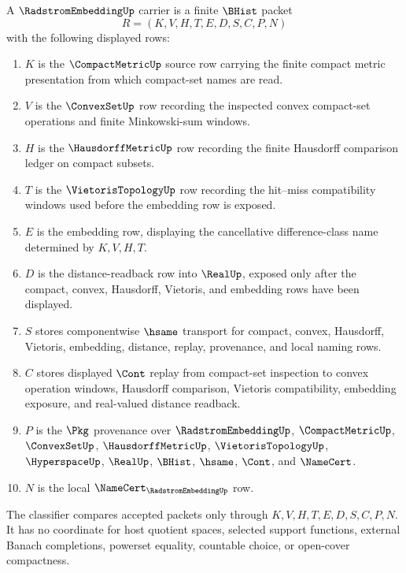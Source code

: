 \begin{definition}\label{def:radstrom-embedding-carrier}
A $\RadstromEmbeddingUp$ carrier is a finite $\BHist$ packet
$$
R=(K,V,H,T,E,D,S,C,P,N)
$$
with the following displayed rows:
\begin{enumerate}
\item $K$ is the $\CompactMetricUp$ source row carrying the finite compact metric presentation from which compact-set names are read.
\item $V$ is the $\ConvexSetUp$ row recording the inspected convex compact-set operations and finite Minkowski-sum windows.
\item $H$ is the $\HausdorffMetricUp$ row recording the finite Hausdorff comparison ledger on compact subsets.
\item $T$ is the $\VietorisTopologyUp$ row recording the hit--miss compatibility windows used before the embedding row is exposed.
\item $E$ is the embedding row, displaying the cancellative difference-class name determined by $K,V,H,T$.
\item $D$ is the distance-readback row into $\RealUp$, exposed only after the compact, convex, Hausdorff, Vietoris, and embedding rows have been displayed.
\item $S$ stores componentwise $\hsame$ transport for compact, convex, Hausdorff, Vietoris, embedding, distance, replay, provenance, and local naming rows.
\item $C$ stores displayed $\Cont$ replay from compact-set inspection to convex operation windows, Hausdorff comparison, Vietoris compatibility, embedding exposure, and real-valued distance readback.
\item $P$ is the $\Pkg$ provenance over $\RadstromEmbeddingUp$, $\CompactMetricUp$, $\ConvexSetUp$, $\HausdorffMetricUp$, $\VietorisTopologyUp$, $\HyperspaceUp$, $\RealUp$, $\BHist$, $\hsame$, $\Cont$, and $\NameCert$.
\item $N$ is the local $\NameCert_{\RadstromEmbeddingUp}$ row.
\end{enumerate}
The classifier compares accepted packets only through $K,V,H,T,E,D,S,C,P,N$. It has no coordinate for host quotient spaces, selected support functions, external Banach completions, powerset equality, countable choice, or open-cover compactness.
\end{definition}

